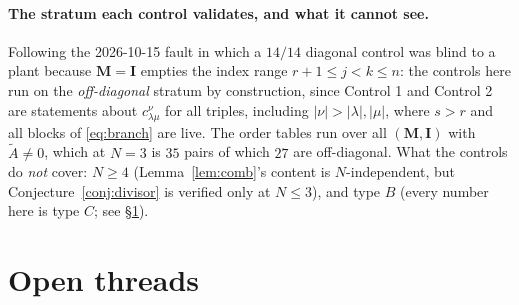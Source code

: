 \documentclass[11pt]{article}
\theoremstyle{plain}
\theoremstyle{definition}
\theoremstyle{remark}
\theoremstyle{plain}
\newcommand{\bI}{\mathbf{I}}
\newcommand{\bM}{\mathbf{M}}
\newcommand{\At}{\widetilde{A}}
\begin{document}
\paragraph{The stratum each control validates, and what it cannot see.}
Following the 2026-10-15 fault in which a $14/14$ diagonal control was blind to
a plant because $\bM=\bI$ empties the index range $r+1\le j<k\le n$: the
controls here run on the \emph{off-diagonal} stratum by construction, since
Control 1 and Control 2 are statements about $c^{\nu}_{\lambda\mu}$ for all
triples, including $|\nu|>|\lambda|,|\mu|$, where $s>r$ and all blocks of
\eqref{eq:branch} are live.  The order tables run over all $(\bM,\bI)$ with
$\At\ne0$, which at $N=3$ is $35$ pairs of which $27$ are off-diagonal.  What
the controls do \emph{not} cover: $N\ge4$ (Lemma~\ref{lem:comb}'s content is
$N$-independent, but Conjecture~\ref{conj:divisor} is verified only at
$N\le3$), and type $B$ (every number here is type $C$; see
\S\ref{sec:open}).

\section{Open threads}
\label{sec:open}
\end{document}
